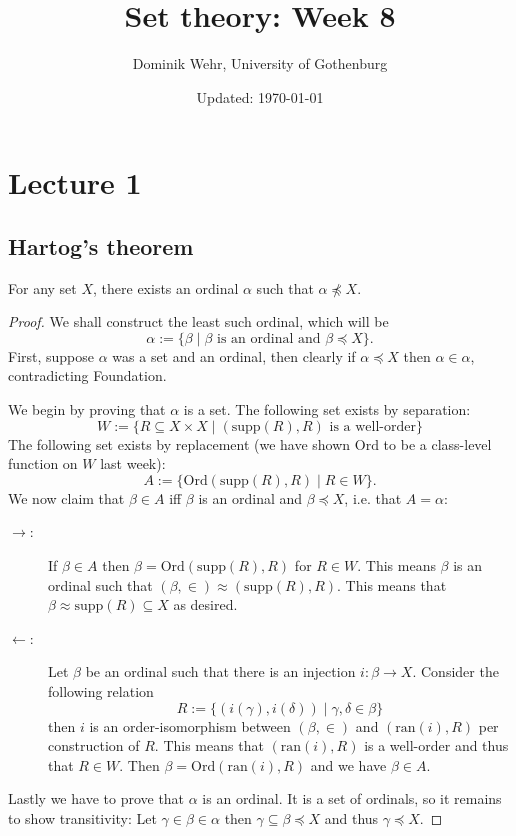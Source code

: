 \documentclass{whrartcl}
\title{Set theory: Week 8}
\author{Dominik Wehr, University of Gothenburg}
\date{Updated: \today}
\newcommand{\ran}{\text{ran}}
\newcommand{\ord}{\text{Ord}}
\newcommand{\supp}{\text{supp}}
\begin{document}
\maketitle

\section{Lecture 1}

\subsection{Hartog's theorem}

\begin{theorem}
  For any set $X$, there exists an ordinal $\alpha$ such that $\alpha
  \not\preceq X$.
\end{theorem}
\begin{proof}
  We shall construct the least such ordinal, which will be
  \[
    \alpha := \{\beta \mid \beta \text{ is an ordinal and } \beta \preceq X\}.
  \]
  First, suppose $\alpha$ was a set and an ordinal, then clearly if $\alpha
  \preceq X$ then $\alpha \in \alpha$, contradicting Foundation.

  We begin by proving that $\alpha$ is a set. The following set exists by
  separation:
  \[
    W := \{R \subseteq X \times X \mid (\supp(R), R) \text{ is a well-order}\}
  \]
  The following set exists by replacement (we have shown $\ord$ to be a
  class-level function on $W$ last week):
  \[
    A := \{\ord(\supp(R), R) \mid R \in W\}.
  \]
  We now claim that $\beta \in A$ iff $\beta$ is an ordinal and $\beta \preceq
  X$, i.e. that $A = \alpha$:
  \begin{description}
  \item[$\to$:] If $\beta \in A$ then $\beta = \ord(\supp(R), R)$ for $R \in W$.
    This means $\beta$ is an ordinal such that $(\beta, \in) \approx (\supp(R),
    R)$. This means that $\beta \approx \supp(R) \subseteq X$ as desired.
  \item[$\leftarrow$:] Let $\beta$ be an ordinal such that there is an injection
    $i : \beta \to X$. Consider the following relation
    \[
      R := \{(i(\gamma), i(\delta)) \mid \gamma, \delta \in \beta\}
    \]
    then $i$ is an order-isomorphism between $(\beta, \in)$
    and $(\ran(i), R)$ per construction of $R$. This means that $(\ran(i), R)$ is
    a well-order and thus that $R \in W$. Then $\beta = \ord(\ran(i),
    R)$ and we have $\beta \in A$.
  \end{description}

  Lastly we have to prove that $\alpha$ is an ordinal. It is a set of ordinals,
  so it remains to show transitivity: Let $\gamma \in \beta \in \alpha$ then
  $\gamma \subseteq \beta \preceq X$ and thus $\gamma \preceq X$.
\end{proof}
\end{document}
